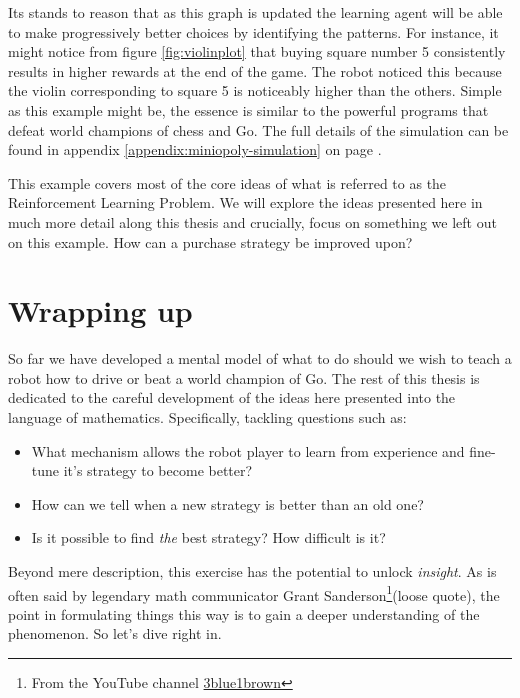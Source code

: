 Its stands to reason that as this graph is updated the learning 
agent will be able to make progressively better choices by 
identifying the patterns. For instance, it might notice from 
figure \ref{fig:violinplot} that buying square number 5 
consistently results in higher rewards at the end of the game. 
The robot noticed this because the violin corresponding to 
square 5 is noticeably higher than the others. Simple as this 
example might be, the essence is similar to the powerful 
programs that defeat world champions of chess and Go. The full 
details of the simulation can be found in appendix 
\ref{appendix:miniopoly-simulation} on page 
\pageref{appendix:miniopoly-simulation}.

This example covers most of the core ideas of what is referred 
to as the Reinforcement Learning Problem. We will explore the 
ideas presented here in much more detail along this thesis and 
crucially, focus on something we left out on this example. How 
can a purchase strategy be improved upon?

\section{Wrapping up}
So far we have developed a mental model of what to do should we 
wish to teach a robot how to drive or beat a world champion of 
Go. The rest of this thesis is dedicated to the careful 
development of the ideas here presented into the language of 
mathematics. Specifically, tackling questions such as:
\begin{itemize}
	\item What mechanism allows the robot player to learn from 
	experience and fine-tune it's strategy to become better?
	\item How can we tell when a new strategy is better than an 
	old one?
	\item Is it possible to find \textit{the} best strategy? 
	How difficult is it?
\end{itemize}

Beyond mere description, this exercise has the potential to 
unlock \textit{insight}. As is often said by legendary math 
communicator Grant Sanderson\footnote{From the YouTube channel 
\href{https://www.youtube.com/channel/UCYO_jab_esuFRV4b17AJtAw}{3blue1brown}}(loose 
quote), the point in formulating things this way is to gain a 
deeper understanding of the phenomenon. So let's dive right in.
